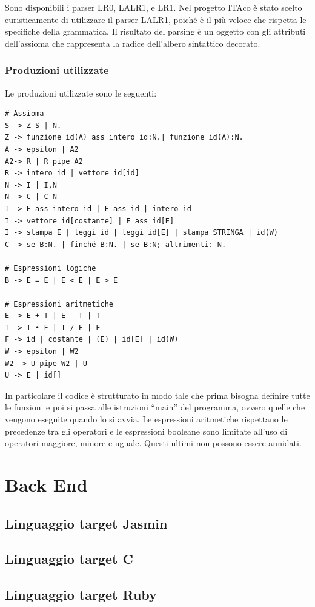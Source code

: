 \documentclass[11pt, a4paper, twoside, notitlepage]{report}
\begin{document}
Sono disponibili i parser LR0, LALR1, e LR1. Nel progetto ITAco è stato scelto
euristicamente di utilizzare il parser LALR1, poiché è il più veloce che
rispetta le specifiche della grammatica. Il risultato del parsing è un oggetto
con gli attributi dell'assioma che rappresenta la radice dell'albero sintattico
decorato.
\subsection{Produzioni utilizzate}
Le produzioni utilizzate sono le seguenti:
\begin{verbatim}
# Assioma
S -> Z S | N.
Z -> funzione id(A) ass intero id:N.| funzione id(A):N.
A -> epsilon | A2
A2-> R | R pipe A2 
R -> intero id | vettore id[id]
N -> I | I,N
N -> C | C N
I -> E ass intero id | E ass id | intero id
I -> vettore id[costante] | E ass id[E]
I -> stampa E | leggi id | leggi id[E] | stampa STRINGA | id(W)
C -> se B:N. | finché B:N. | se B:N; altrimenti: N.

# Espressioni logiche
B -> E = E | E < E | E > E

# Espressioni aritmetiche
E -> E + T | E - T | T
T -> T • F | T / F | F
F -> id | costante | (E) | id[E] | id(W)
W -> epsilon | W2
W2 -> U pipe W2 | U
U -> E | id[]
\end{verbatim}

In particolare il codice è strutturato in modo tale che prima bisogna definire
tutte le funzioni e poi si passa alle istruzioni ``main'' del programma, ovvero
quelle che vengono eseguite quando lo si avvia. Le espressioni aritmetiche
rispettano le precedenze tra gli operatori e le espressioni booleane sono
limitate all'uso di operatori maggiore, minore e uguale. Questi ultimi non
possono essere annidati.
\chapter{Back End}
\label{back_end}
\section{Linguaggio target Jasmin}
\section{Linguaggio target C}
\section{Linguaggio target Ruby}
\end{document}
